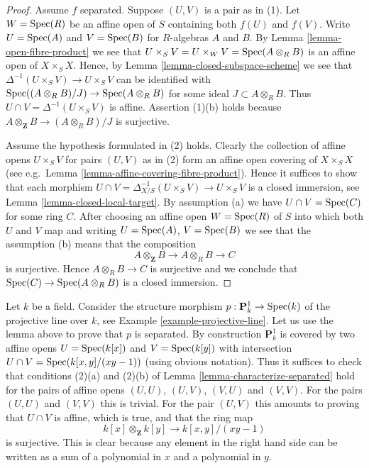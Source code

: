 \begin{proof}
Assume $f$ separated. Suppose $(U, V)$ is a pair as in (1).
Let $W = \mathop{\mathrm{Spec}}(R)$ be an affine open of $S$ containing
both $f(U)$ and $f(V)$. Write $U = \mathop{\mathrm{Spec}}(A)$ and
$V = \mathop{\mathrm{Spec}}(B)$ for $R$-algebras $A$ and $B$.
By Lemma \ref{lemma-open-fibre-product} we see that
$U \times_S V = U \times_W V = \mathop{\mathrm{Spec}}(A \otimes_R B)$
is an affine open of $X \times_S X$. Hence, by
Lemma \ref{lemma-closed-subspace-scheme} we see that
$\Delta^{-1}(U \times_S V) \to U \times_S V$
can be identified with $\mathop{\mathrm{Spec}}((A \otimes_R B)/J) \to \mathop{\mathrm{Spec}}(A \otimes_R B)$
for some ideal $J \subset A \otimes_R B$.
Thus $U \cap V = \Delta^{-1}(U \times_S V)$ is affine.
Assertion (1)(b) holds because
$A \otimes_{\mathbf{Z}} B \to (A \otimes_R B)/J$ is surjective.

\medskip\noindent
Assume the hypothesis formulated in (2) holds.
Clearly the collection of affine opens $U \times_S V$
for pairs $(U, V)$ as in (2) form an affine open covering
of $X \times_S X$ (see e.g.\ Lemma \ref{lemma-affine-covering-fibre-product}).
Hence it suffices to show that each morphism
$U \cap V = \Delta_{X/S}^{-1}(U \times_S V) \to U \times_S V$
is a closed immersion, see Lemma \ref{lemma-closed-local-target}.
By assumption (a) we have $U \cap V = \mathop{\mathrm{Spec}}(C)$ for some ring $C$.
After choosing an affine open $W = \mathop{\mathrm{Spec}}(R)$ of $S$
into which both $U$ and $V$ map and writing $U = \mathop{\mathrm{Spec}}(A)$,
$V = \mathop{\mathrm{Spec}}(B)$ we see that the assumption (b) means
that the composition
$$
A \otimes_{\mathbf{Z}} B \to A \otimes_R B \to C
$$
is surjective. Hence $A \otimes_R B \to C$ is surjective and
we conclude that $\mathop{\mathrm{Spec}}(C) \to \mathop{\mathrm{Spec}}(A \otimes_R B)$
is a closed immersion.
\end{proof}

\begin{example}
\label{example-projective-line-separated}
Let $k$ be a field. Consider the structure morphism
$p : \mathbf{P}^1_k \to \mathop{\mathrm{Spec}}(k)$ of the projective
line over $k$, see Example \ref{example-projective-line}.
Let us use the lemma above to prove that $p$
is separated. By construction $\mathbf{P}^1_k$ is covered by two
affine opens $U = \mathop{\mathrm{Spec}}(k[x])$ and $V = \mathop{\mathrm{Spec}}(k[y])$
with intersection $U \cap V = \mathop{\mathrm{Spec}}(k[x, y]/(xy - 1))$
(using obvious notation). Thus it suffices to check that
conditions (2)(a) and (2)(b) of Lemma \ref{lemma-characterize-separated}
hold for the pairs of affine opens $(U, U)$, $(U, V)$, $(V, U)$
and $(V, V)$. For the pairs $(U, U)$ and $(V, V)$ this is trivial.
For the pair $(U, V)$ this amounts to proving
that $U \cap V$ is affine, which is true, and that the ring map
$$
k[x] \otimes_{\mathbf{Z}} k[y] \longrightarrow k[x, y]/(xy - 1)
$$
is surjective. This is clear because any element in the
right hand side can be written as a sum of a polynomial
in $x$ and a polynomial in $y$.
\end{example}


